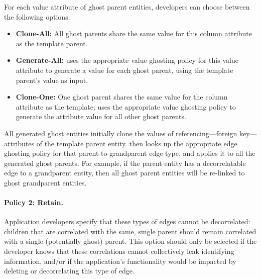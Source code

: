 For each value attribute of ghost parent entities, developers can choose between the
following options:
\begin{itemize}
    \item \textbf{Clone-All:} All ghost parents share the same value for this column attribute as the
        template parent.
    \item \textbf{Generate-All:} \sys uses the appropriate value ghosting policy for this
        value attribute to generate a value for each ghost parent, using the template parent's value
        as input.
    \item \textbf{Clone-One:} One ghost parent shares the same value for the column attribute as the
        template; \sys uses the appropriate value ghosting policy to generate the attribute value
        for all other ghost parents.
\end{itemize}

All generated ghost entities initially clone the values of referencing---foreign key---attributes of
the template parent entity.  \sys then looks up the appropriate edge ghosting policy for that
parent-to-grandparent edge type, and applies it to all the generated ghost parents. For example, if
the parent entity has a decorrelatable edge to a grandparent entity, then all ghost parent entities
will be re-linked to ghost grandparent entities.

%
%
\paragraph{Policy 2: Retain.}
Application developers specify that these types of edges cannot be decorrelated: children 
that are correlated with the same, single parent should remain correlated with a single (potentially
ghost) parent. This option should only be selected if the developer knows that these correlations
cannot collectively leak identifying information, and/or if the application's functionality would be
impacted by deleting or decorrelating this type of edge.

